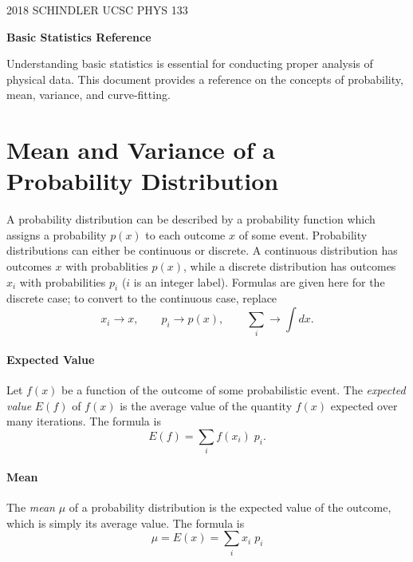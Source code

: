 \documentclass[11pt]{article}
\begin{document}
\begin{flushright}
2018 SCHINDLER UCSC PHYS 133
\end{flushright}

\begin{center}
\noindent  \textbf{ \LARGE Basic Statistics Reference}
\end{center}

Understanding basic statistics is essential for conducting proper analysis of physical data. This document provides a reference on the concepts of probability, mean, variance, and curve-fitting.

\section*{Mean and Variance of a Probability Distribution}

A probability distribution can be described by a probability function which assigns a probability $p(x)$ to each outcome $x$ of some event. Probability distributions can either be continuous or discrete. A continuous distribution has outcomes $x$ with probablities $p(x)$, while a discrete distribution has outcomes $x_i$ with probabilities $p_i$ ($i$ is an integer label). Formulas are given here for the discrete case; to convert to the continuous case, replace
\begin{equation*}
	x_i \to x,
	\qquad
	p_i \to p(x),
	\qquad
	\sum_i \to \int dx.
\end{equation*}

\paragraph*{Expected Value}
Let $f(x)$ be a function of the outcome of some probabilistic event. The \textit{expected value} $E(f)$ of $f(x)$ is the average value of the quantity $f(x)$ expected over many iterations. The formula is
\begin{equation*}
	E(f) = \sum_i f(x_i) \; p_i .
\end{equation*}

\paragraph*{Mean}
The \textit{mean} $\mu$ of a probability distribution is the expected value of the outcome, which is simply its average value. The formula is
\begin{equation*}
	\mu = E(x) = \sum_i x_i \; p_i
\end{equation*}
\end{document}
